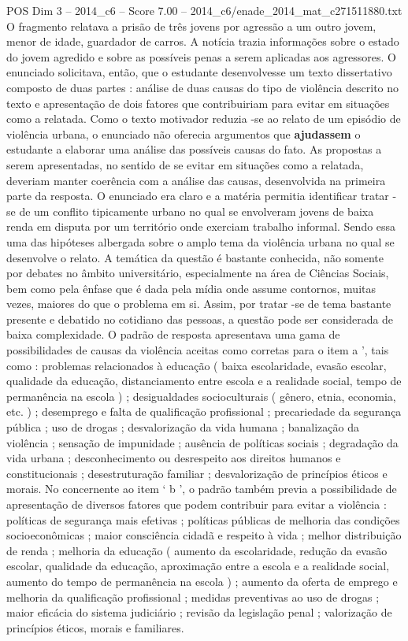 \begin{textsample}{POS Dim 3 – 2014\_c6 – Score 7.00 – 2014\_c6/enade\_2014\_mat\_c271511880.txt}
O fragmento relatava a prisão de três jovens por agressão a um outro jovem, menor de idade, guardador de carros.
A notícia trazia informações sobre o estado do jovem agredido e sobre as possíveis penas a serem aplicadas aos agressores.
O enunciado solicitava, então, que o estudante desenvolvesse um texto dissertativo composto de duas partes : análise de duas causas do tipo de violência descrito no texto e apresentação de dois fatores que contribuiriam para evitar em situações como a relatada.
Como o texto motivador reduzia -se ao relato de um episódio de violência urbana, o enunciado não oferecia argumentos que \textbf{ajudassem} o estudante a elaborar uma análise das possíveis causas do fato.
As propostas a serem apresentadas, no sentido de se evitar em situações como a relatada, deveriam manter coerência com a análise das causas, desenvolvida na primeira parte da resposta.
O enunciado era claro e a matéria permitia identificar tratar -se de um conflito tipicamente urbano no qual se envolveram jovens de baixa renda em disputa por um território onde exerciam trabalho informal.
Sendo essa uma das hipóteses albergada sobre o amplo tema da violência urbana no qual se desenvolve o relato.
A temática da questão é bastante conhecida, não somente por debates no âmbito universitário, especialmente na área de Ciências Sociais, bem como pela ênfase que é dada pela mídia onde assume contornos, muitas vezes, maiores do que o problema em si.
Assim, por tratar -se de tema bastante presente e debatido no cotidiano das pessoas, a questão pode ser considerada de baixa complexidade.
O padrão de resposta apresentava uma gama de possibilidades de causas da violência aceitas como corretas para o item a ’, tais como : problemas relacionados à educação ( baixa escolaridade, evasão escolar, qualidade da educação, distanciamento entre escola e a realidade social, tempo de permanência na escola ) ; desigualdades socioculturais ( gênero, etnia, economia, etc. ) ; desemprego e falta de qualificação profissional ; precariedade da segurança pública ; uso de drogas ; desvalorização da vida humana ; banalização da violência ; sensação de impunidade ; ausência de políticas sociais ; degradação da vida urbana ; desconhecimento ou desrespeito aos direitos humanos e constitucionais ; desestruturação familiar ; desvalorização de princípios éticos e morais.
No concernente ao item ‘ b ’, o padrão também previa a possibilidade de apresentação de diversos fatores que podem contribuir para evitar a violência : políticas de segurança mais efetivas ; políticas públicas de melhoria das condições socioeconômicas ; maior consciência cidadã e respeito à vida ; melhor distribuição de renda ; melhoria da educação ( aumento da escolaridade, redução da evasão escolar, qualidade da educação, aproximação entre a escola e a realidade social, aumento do tempo de permanência na escola ) ; aumento da oferta de emprego e melhoria da qualificação profissional ; medidas preventivas ao uso de drogas ; maior eficácia do sistema judiciário ; revisão da legislação penal ; valorização de princípios éticos, morais e familiares.

\end{textsample}

